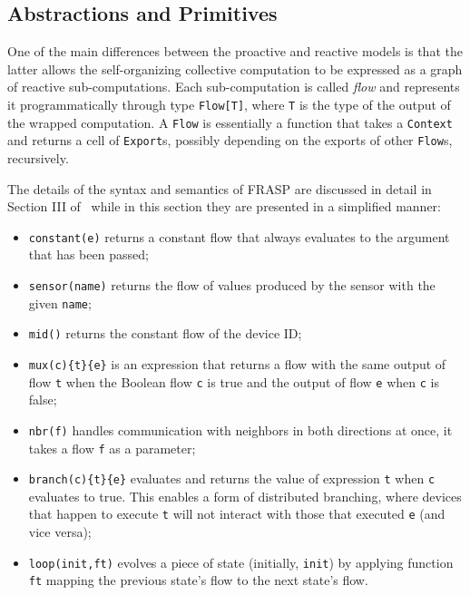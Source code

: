 \documentclass[12pt,a4paper,openright,twoside]{book}
\begin{document}
\subsection{Abstractions and Primitives}

One of the main differences between the proactive and reactive models is that the latter allows the self-organizing collective computation to be expressed as a graph of reactive sub-computations. Each sub-computation is called \textit{flow} and represents it programmatically through type \texttt{Flow[T]}, where \texttt{T} is the type of the output of the wrapped computation. A \texttt{Flow} is essentially a function that takes a \texttt{Context} and returns a cell of \texttt{Export}s, possibly depending on the exports of other \texttt{Flow}s, recursively.

The details of the syntax and semantics of FRASP are discussed in detail in Section III of~\cite{Casadei2023} while in this section they are presented in a simplified manner:

\begin{itemize}
    \item \texttt{constant(e)} returns a constant flow that always evaluates to the argument that has been passed;
    \item \texttt{sensor(name)} returns the flow of values produced by the sensor with the given \texttt{name};
    \item \texttt{mid()} returns the constant flow of the device ID;
    \item \texttt{mux(c)\{t\}\{e\}} is an expression that returns a flow with the same output of flow \texttt{t} when the Boolean flow \texttt{c} is true and the output of flow \texttt{e} when \texttt{c} is false;
    \item \texttt{nbr(f)} handles communication with neighbors in both directions at once, it takes a flow \texttt{f} as a parameter;
    \item \texttt{branch(c)\{t\}\{e\}} evaluates and returns the value of expression \texttt{t} when \texttt{c} evaluates to true. This enables a form of distributed branching, where devices that happen to execute \texttt{t} will not interact with those that executed \texttt{e} (and vice versa);
    \item \texttt{loop(init,ft)} evolves a piece of state (initially, \texttt{init}) by applying function \texttt{ft} mapping the previous state's flow to the next state's flow.
\end{itemize}
\end{document}

